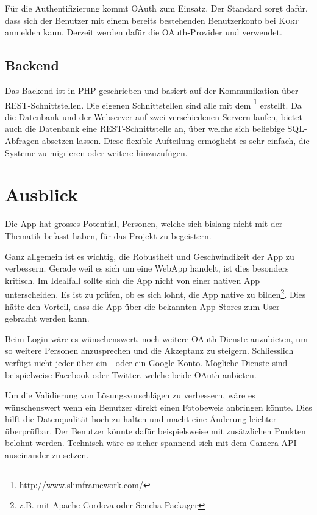 Für die Authentifizierung kommt \gls{OAuth} zum Einsatz.
Der Standard sorgt dafür, dass sich der Benutzer mit einem bereits bestehenden Benutzerkonto bei \textsc{Kort} anmelden kann.
Derzeit werden dafür die \gls{OAuth}-Provider  und  verwendet.

\subsection*{Backend}
Das Backend ist in PHP geschrieben und basiert auf der Kommunikation über \gls{REST}-Schnittstellen.
Die eigenen Schnittstellen sind alle mit dem \footnote{\url{http://www.slimframework.com/}} erstellt.
Da die Datenbank und der Webserver auf zwei verschiedenen Servern laufen, bietet auch die Datenbank eine \gls{REST}-Schnittstelle an, über welche sich beliebige SQL-Abfragen absetzen lassen.
Diese flexible Aufteilung ermöglicht es sehr einfach, die Systeme zu migrieren oder weitere hinzuzufügen.

\section*{Ausblick}
Die App hat grosses Potential, Personen, welche sich bislang nicht mit der Thematik  befasst haben, für das Projekt zu begeistern.

Ganz allgemein ist es wichtig, die Robustheit und Geschwindikeit der App zu verbessern. 
Gerade weil es sich um eine \gls{WebApp} handelt, ist dies besonders kritisch. 
Im Idealfall sollte sich die App nicht von einer nativen App unterscheiden.
Es ist zu prüfen, ob es sich lohnt, die App native zu bilden\footnote{z.B. mit Apache Cordova oder Sencha Packager}.
Dies hätte den Vorteil, dass die App über die bekannten \glspl{App-Store} zum User gebracht werden kann.

Beim Login wäre es wünschenswert, noch weitere \gls{OAuth}-Dienste anzubieten, um so weitere Personen anzusprechen und die Akzeptanz zu steigern.
Schliesslich verfügt nicht jeder über ein - oder ein Google-Konto.
Mögliche Dienste sind beispielweise Facebook oder Twitter, welche beide \gls{OAuth} anbieten.

Um die Validierung von Lösungsvorschlägen zu verbessern, wäre es wünschenswert wenn ein Benutzer direkt einen Fotobeweis anbringen könnte.
Dies hilft die Datenqualität hoch zu halten und macht eine Änderung leichter überprüfbar.
Der Benutzer könnte dafür beispielsweise mit zusätzlichen Punkten belohnt werden.
Technisch wäre es sicher spannend sich mit dem \gls{Camera API} auseinander zu setzen.

